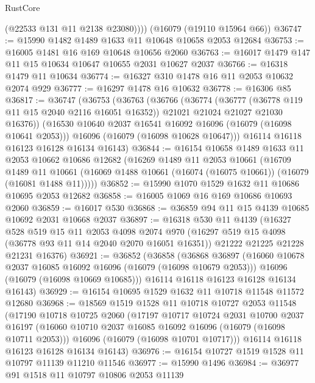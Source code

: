 \begin{lexlean}{RustCore}
\begin{coremodule}
          (@22533 @131 @11 @2138 @23080))))
    (@16079 (@19110 @15964 @66))
@36747 := @15990 @1482 @1489 @1633 @11 @10648 @10658 @2053 @12684
@36753 := @16005 @1481 @16 @169 @10648 @10656 @2060
@36763 := @16017 @1479 @147 @11 @15 @10634 @10647 @10655 @2031 @10627 @2037
@36766 := @16318 @1479 @11 @10634
@36774 := @16327 @310 @1478 @16 @11 @2053 @10632 @2074 @929
@36777 := @16297 @1478 @16 @10632
@36778 := @16306 @85
@36817 := @36747
    (@36753
      (@36763
        (@36766
          (@36774
            (@36777 (@36778 @119 @11 @15 @2040 @2116 @16051 @16352))
            @21021
            @21024
            @21027
            @21030
            @16376))
        (@16530 @10640 @2037 @16541 @16092 @16096 (@16079 (@16098 @10641 @2053)))
        @16096
        (@16079 (@16098 @10628 @10647)))
      @16114
      @16118
      @16123
      @16128
      @16134
      @16143)
@36844 := @16154
    @10658
    @1489
    @1633
    @11
    @2053
    @10662
    @10686
    @12682
    (@16269
      @1489
      @11
      @2053
      @10661
      (@16709
        @1489
        @11
        @10661
        (@16069 @1488 @10661 (@16074 (@16075 @10661)) (@16079 (@16081 @1488 @11)))))
@36852 := @15990 @1070 @1529 @1632 @11 @10686 @10695 @2053 @12682
@36858 := @16005 @1069 @16 @169 @10686 @10693 @2060
@36859 := @16017 @530
@36868 := @36859 @94 @11 @15 @4139 @10685 @10692 @2031 @10668 @2037
@36897 := @16318
    @530
    @11
    @4139
    (@16327
      @528
      @519
      @15
      @11
      @2053
      @4098
      @2074
      @970
      (@16297 @519 @15 @4098 (@36778 @93 @11 @14 @2040 @2070 @16051 @16351))
      @21222
      @21225
      @21228
      @21231
      @16376)
@36921 := @36852
    (@36858
      (@36868
        @36897
        (@16060 @10678 @2037 @16085 @16092 @16096 (@16079 (@16098 @10679 @2053)))
        @16096
        (@16079 (@16098 @10669 @10685)))
      @16114
      @16118
      @16123
      @16128
      @16134
      @16143)
@36929 := @16154 @10695 @1529 @1632 @11 @10718 @11548 @11572 @12680
@36968 := @18569
    @1519
    @1528
    @11
    @10718
    @10727
    @2053
    @11548
    (@17190
      @10718
      @10725
      @2060
      (@17197
        @10717
        @10724
        @2031
        @10700
        @2037
        @16197
        (@16060 @10710 @2037 @16085 @16092 @16096 (@16079 (@16098 @10711 @2053)))
        @16096
        (@16079 (@16098 @10701 @10717)))
      @16114
      @16118
      @16123
      @16128
      @16134
      @16143)
@36976 := @16154 @10727 @1519 @1528 @11 @10797 @11139 @11210 @11546
@36977 := @15990 @1496
@36984 := @36977 @91 @1518 @11 @10797 @10806 @2053 @11139

\end{coremodule}
\end{lexlean}
